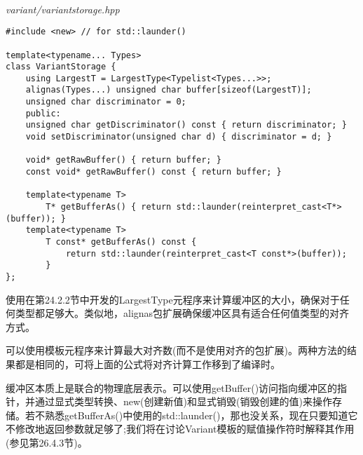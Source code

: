 \hspace*{\fill} \\ %
\noindent
\textit{variant/variantstorage.hpp}
\begin{lstlisting}[style=styleCXX]
#include <new> // for std::launder()

template<typename... Types>
class VariantStorage {
	using LargestT = LargestType<Typelist<Types...>>;
	alignas(Types...) unsigned char buffer[sizeof(LargestT)];
	unsigned char discriminator = 0;
	public:
	unsigned char getDiscriminator() const { return discriminator; }
	void setDiscriminator(unsigned char d) { discriminator = d; }
	
	void* getRawBuffer() { return buffer; }
	const void* getRawBuffer() const { return buffer; }
	
	template<typename T>
		T* getBufferAs() { return std::launder(reinterpret_cast<T*>(buffer)); }
	template<typename T>
		T const* getBufferAs() const {
			return std::launder(reinterpret_cast<T const*>(buffer));
		}
};
\end{lstlisting}

使用在第24.2.2节中开发的LargestType元程序来计算缓冲区的大小，确保对于任何类型都足够大。类似地，alignas包扩展确保缓冲区具有适合任何值类型的对齐方式。

\begin{tcolorbox}[colback=webgreen!5!white,colframe=webgreen!75!black]
\hspace*{0.75cm}可以使用模板元程序来计算最大对齐数(而不是使用对齐的包扩展)。两种方法的结果都是相同的，可将上面的公式将对齐计算工作移到了编译时。
\end{tcolorbox}

缓冲区本质上是联合的物理底层表示。可以使用getBuffer()访问指向缓冲区的指针，并通过显式类型转换、new(创建新值)和显式销毁(销毁创建的值)来操作存储。若不熟悉getBufferAs()中使用的std::launder()，那也没关系，现在只要知道它不修改地返回参数就足够了;我们将在讨论Variant模板的赋值操作符时解释其作用(参见第26.4.3节)。






































